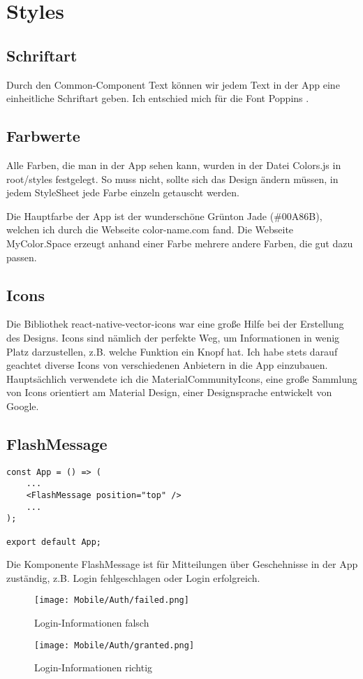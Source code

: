 \section{Styles}
\subsection{Schriftart}
Durch den Common-Component Text können wir jedem Text in der App eine einheitliche Schriftart geben.
Ich entschied mich für die Font Poppins \cite{poppins}.

\subsection{Farbwerte}
Alle Farben, die man in der App sehen kann, wurden in der Datei Colors.js in root/styles festgelegt.
So muss nicht, sollte sich das Design ändern müssen, in jedem StyleSheet jede Farbe einzeln
getauscht werden.

Die Hauptfarbe der App ist der wunderschöne Grünton Jade (\#00A86B), welchen ich durch die Webseite
color-name.com \cite{colorName} fand. Die Webseite MyColor.Space \cite{myColorSpace} erzeugt anhand
einer Farbe mehrere andere Farben, die gut dazu passen.

\subsection{Icons}
Die Bibliothek react-native-vector-icons \cite{reactNativeVectorIcons} war eine große Hilfe bei der
Erstellung des Designs. Icons sind nämlich der perfekte Weg, um Informationen in wenig Platz
darzustellen, z.B. welche Funktion ein Knopf hat. Ich habe stets darauf geachtet diverse Icons von
verschiedenen Anbietern in die App einzubauen. Hauptsächlich verwendete ich die
MaterialCommunityIcons, eine große Sammlung von Icons orientiert am Material Design, einer
Designsprache entwickelt von Google.

\newpage
\subsection{FlashMessage}
\begin{lstlisting}
const App = () => (
    ...
    <FlashMessage position="top" />
    ...
);

export default App;
\end{lstlisting}

Die Komponente FlashMessage ist für Mitteilungen über Geschehnisse in der App zuständig, z.B.
Login fehlgeschlagen oder Login erfolgreich.

\begin{figure}[H]
  \begin{center}
    \texttt{[image: Mobile/Auth/failed.png]}
    \caption{Login-Informationen falsch}
  \end{center}
\end{figure}

\begin{figure}[H]
  \begin{center}
    \texttt{[image: Mobile/Auth/granted.png]}
    \caption{Login-Informationen richtig}
  \end{center}
\end{figure}